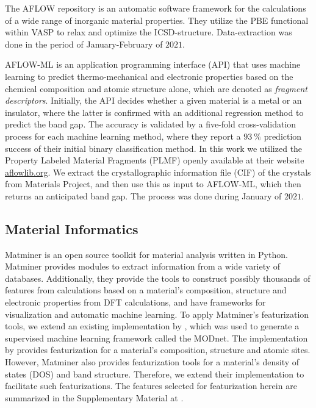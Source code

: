 \documentclass[superscriptaddress,unsortedaddress,
 amsmath,amssymb,
 aps,
]{revtex4-2}
\begin{document}
The AFLOW \cite{Curtarolo2012, Curtarolo2012a, Calderon2015} repository is an automatic software framework for the calculations of a wide range of inorganic material properties. They utilize the PBE functional within VASP 
to relax and optimize the ICSD-structure.  Data-extraction was done in the period of January-February of $2021$.

AFLOW-ML \cite{Isayev2017} is an application programming interface (API) that uses machine learning to predict thermo-mechanical and electronic properties based on the chemical composition and atomic structure alone, which are denoted as \textit{fragment descriptors}. Initially, the API decides whether a given material is a metal or an insulator, where the latter is confirmed with an additional regression method to predict the band gap. The accuracy is validated by a five-fold cross-validation process for each machine learning method, where they report a $93 \ \%$ prediction success of their initial binary classification method. In this work we utilized the Property Labeled Material Fragments (PLMF) openly available at their website \url{aflowlib.org}. We extract the crystallographic information file (CIF) of the crystals from Materials Project, and then use this as input to AFLOW-ML, which then returns an anticipated band gap. The process was done during January of $2021$. 

\subsection*{Material Informatics}  
Matminer \cite{Ward2018} is an open source toolkit for material analysis written in Python. Matminer provides modules to extract information from a wide variety of databases. Additionally, they provide the tools to construct possibly thousands of features from calculations based on a material's composition, structure and electronic properties from DFT calculations, and have frameworks for visualization and automatic machine learning. 
To apply Matminer's featurization tools, we extend an existing implementation by \citeauthor{Breuck2021} \cite{Breuck2021}, which was used to generate a supervised machine learning framework called the MODnet. The implementation by \citeauthor{Breuck2021} provides featurization for a material's composition, structure and atomic sites. However, Matminer also provides featurization tools for a material's density of states (DOS) and band structure. Therefore, we extend their implementation to facilitate such featurizations. The features selected for featurization herein are summarized in the Supplementary Material at \cite{supplementary}. 
\end{document}
